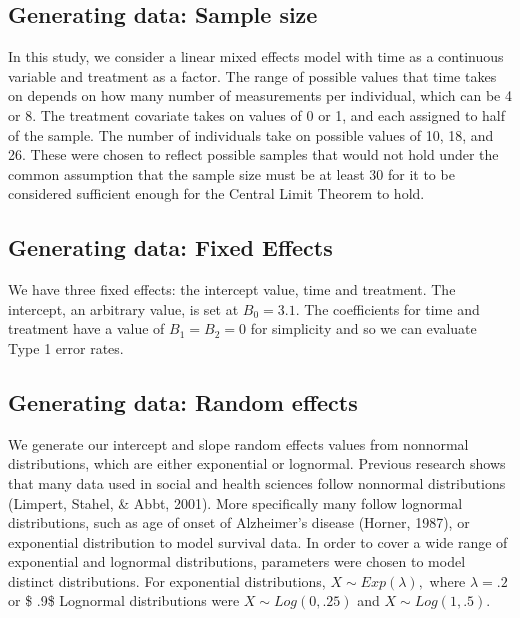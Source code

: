 \documentclass[12pt, twoside]{amherstthesis}
\begin{document}
\hypertarget{generating-data-sample-size}{%
\subsection{Generating data: Sample size}\label{generating-data-sample-size}}

In this study, we consider a linear mixed effects model with time as a continuous variable and treatment as a factor. The range of possible values that time takes on depends on how many number of measurements per individual, which can be 4 or 8. The treatment covariate takes on values of 0 or 1, and each assigned to half of the sample. The number of individuals take on possible values of 10, 18, and 26. These were chosen to reflect possible samples that would not hold under the common assumption that the sample size must be at least 30 for it to be considered sufficient enough for the Central Limit Theorem to hold.

\hypertarget{generating-data-fixed-effects}{%
\subsection{Generating data: Fixed Effects}\label{generating-data-fixed-effects}}

We have three fixed effects: the intercept value, time and treatment. The intercept, an arbitrary value, is set at \(B_0 = 3.1\). The coefficients for time and treatment have a value of \(B_1 = B_2 = 0\) for simplicity and so we can evaluate Type 1 error rates.

\hypertarget{generating-data-random-effects}{%
\subsection{Generating data: Random effects}\label{generating-data-random-effects}}

We generate our intercept and slope random effects values from nonnormal distributions, which are either exponential or lognormal. Previous research shows that many data used in social and health sciences follow nonnormal distributions (Limpert, Stahel, \& Abbt, 2001). More specifically many follow lognormal distributions, such as age of onset of Alzheimer's disease (Horner, 1987), or exponential distribution to model survival data. In order to cover a wide range of exponential and lognormal distributions, parameters were chosen to model distinct distributions. For exponential distributions, \(X\sim\mathit{Exp}(\lambda),\) where \(\lambda = .2\) or \$ .9\$ Lognormal distributions were \(X\sim\mathit{Log}(0,.25)\) and \(X\sim\mathit{Log}(1,.5).\)
\end{document}
